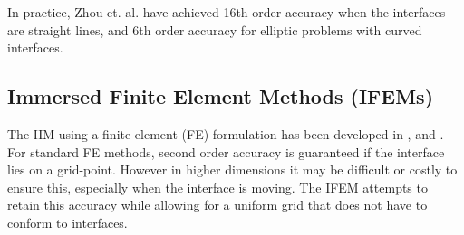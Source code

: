 In practice, Zhou et. al. \cite{zhouetal06} have achieved 16th order accuracy when the interfaces are straight lines, and 6th order accuracy for elliptic problems with curved interfaces.

\subsection{Immersed Finite Element Methods (IFEMs)}

The IIM using a finite element (FE) formulation has been developed in \cite{li98b}, \cite{lilinwu03} and \cite{kafafyetal05}.
For standard FE methods, second order accuracy is guaranteed if the interface lies on a grid-point.
However in higher dimensions it may be difficult or costly to ensure this, especially when the interface is moving.
The IFEM attempts to retain this accuracy while allowing for a uniform grid that does not have to conform to interfaces.
